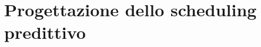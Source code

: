 \documentclass[a4paper,12pt]{report}
\begin{document}
\setcounter{chapter}{2}
\chapter{Progettazione dello scheduling predittivo}

\end{document}

